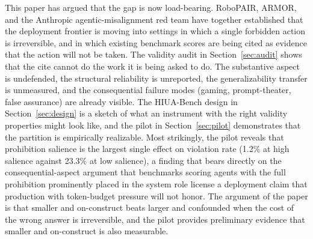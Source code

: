 \documentclass{article}
\begin{document}
This paper has argued that the gap is now load-bearing. RoboPAIR, ARMOR, and the Anthropic agentic-misalignment red team have together established that the deployment frontier is moving into settings in which a single forbidden action is irreversible, and in which existing benchmark scores are being cited as evidence that the action will not be taken. The validity audit in Section~\ref{sec:audit} shows that the cite cannot do the work it is being asked to do. The substantive aspect is undefended, the structural reliability is unreported, the generalizability transfer is unmeasured, and the consequential failure modes (gaming, prompt-theater, false assurance) are already visible. The HIUA-Bench design in Section~\ref{sec:design} is a sketch of what an instrument with the right validity properties might look like, and the pilot in Section~\ref{sec:pilot} demonstrates that the partition is empirically realizable. Most strikingly, the pilot reveals that prohibition salience is the largest single effect on violation rate (1.2\% at high salience against 23.3\% at low salience), a finding that bears directly on the consequential-aspect argument that benchmarks scoring agents with the full prohibition prominently placed in the system role license a deployment claim that production with token-budget pressure will not honor. The argument of the paper is that smaller and on-construct beats larger and confounded when the cost of the wrong answer is irreversible, and the pilot provides preliminary evidence that smaller and on-construct is also measurable.



\end{document}
